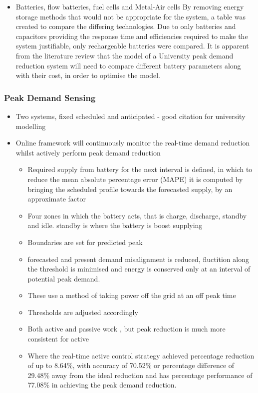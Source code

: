 \begin{itemize}
  \begin{itemize}
  \tightlist
  \item
    Batteries, flow batteries, fuel cells and Metal-Air cells
    \cite{Chen2009291} By removing energy storage methods that would not
    be appropriate for the system, a table was created to compare the
    differing technologies. Due to only batteries and capacitors
    providing the response time and efficiencies required to make the
    system justifiable, only rechargeable batteries were compared. It is
    apparent from the literature review that the model of a University
    peak demand reduction system will need to compare different battery
    parameters along with their cost, in order to optimise the model.
  \end{itemize}
\end{itemize}

\subsubsection{Peak Demand Sensing}\label{peak-demand-sensing}

\begin{itemize}
\tightlist
\item
  Two systems, fixed scheduled and anticipated \cite{20164002874437} -
  good citation for university modelling
\item
  Online framework will continuously monitor the real-time demand
  reduction whilst actively perform peak demand reduction

  \begin{itemize}
  \tightlist
  \item
    Required supply from battery for the next interval is defined, in
    which to reduce the mean absolute percentage error (MAPE) it is
    computed by bringing the scheduled profile towards the forecasted
    supply, by an approximate factor
  \item
    Four zones in which the battery acts, that is charge, discharge,
    standby and idle. standby is where the battery is boost supplying
  \item
    Boundaries are set for predicted peak
  \item
    forecasted and present demand misalignment is reduced, fluctition
    along the threshold is minimised and energy is conserved only at an
    interval of potential peak demand.
  \item
    These use a method of taking power off the grid at an off peak time
  \item
    Thresholds are adjusted accordingly
  \item
    Both active and passive work , but peak reduction is much more
    consistent for active
  \item
    Where the real-time active control strategy achieved percentage
    reduction of up to 8.64\%, with accuracy of 70.52\% or percentage
    difference of 29.48\% away from the ideal reduction and has
    percentage performance of 77.08\% in achieving the peak demand
    reduction.
  \end{itemize}
\end{itemize}

